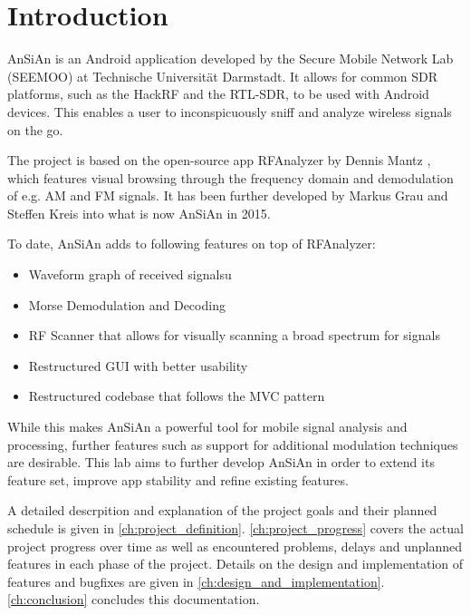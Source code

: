 \chapter{Introduction}\label{ch:introduction}
\glsresetall %
\setcounter{table}{0} %

\ac{AnSiAn} is an Android application developed by the Secure Mobile Network Lab (SEEMOO) at 
Technische Universität Darmstadt. It allows for common \ac{SDR} platforms, such as the HackRF and the RTL-SDR, to be used with Android devices. This enables a user to inconspicuously sniff and analyze wireless signals on the go.

The project is based on the open-source app RFAnalyzer by Dennis Mantz \cite{RFAnalyzer_GitHub}, which features visual browsing through the frequency domain and demodulation of e.g. \ac{AM} and \ac{FM} signals. It has been further developed by Markus Grau and Steffen Kreis into what is now \ac{AnSiAn} in 2015.

To date, \ac{AnSiAn} adds to following features on top of RFAnalyzer:

\begin{itemize}
	\item Waveform graph of received signalsu
	\item Morse Demodulation and Decoding
	\item RF Scanner that allows for visually scanning a broad spectrum for signals
	\item Restructured \ac{GUI} with better usability
	\item Restructured codebase that follows the \ac{MVC} pattern
\end{itemize}

While this makes \ac{AnSiAn} a powerful tool for mobile signal analysis and processing, further features such as support for additional modulation techniques are desirable. This lab aims to further develop \ac{AnSiAn} in order to extend its feature set, improve app stability and refine existing features.

A detailed descrpition and explanation of the project goals and their planned schedule is given in \autoref{ch:project_definition}. \autoref{ch:project_progress} covers the actual project progress over time as well as encountered problems, delays and unplanned features in each phase of the project. Details on the design and implementation of features and bugfixes are given in \autoref{ch:design_and_implementation}.
\autoref{ch:conclusion} concludes this documentation.
